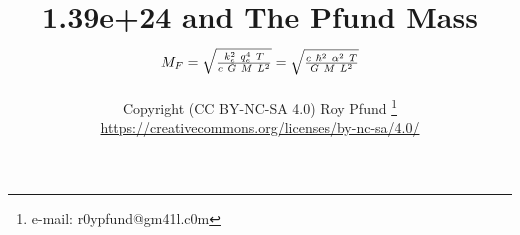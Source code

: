 
\usepackage{pst-node}%
\usepackage{tabu}
\usepackage{natbib}
\usepackage{graphicx}
\usepackage[colorlinks=true,linkcolor=black,anchorcolor=black,citecolor=black,filecolor=black,menucolor=black,runcolor=black,urlcolor=black]{hyperref}%
\title{1.39e+24 and The Pfund Mass $M_F  = \sqrt{k_e^2~q_e^4~T \over c~G~M~L^2}= \sqrt{c~ \hbar^2 ~\alpha^2 ~T\over G~M~L^2}$ }
\author{Copyright (CC BY-NC-SA 4.0) Roy Pfund \thanks{e-mail: r0ypfund@gm41l.c0m}\\
\url{https://creativecommons.org/licenses/by-nc-sa/4.0/}}

